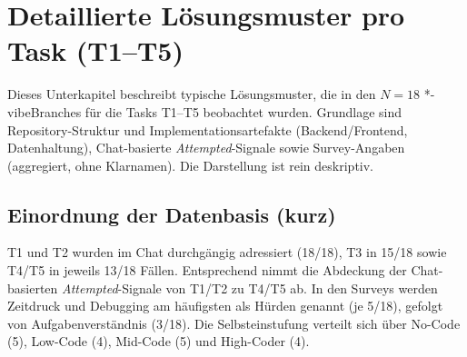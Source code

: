 \section{Detaillierte Lösungsmuster pro Task (T1--T5)}
\label{sec:results_strategies}

Dieses Unterkapitel beschreibt typische Lösungsmuster, die in den $N = 18$ *-vibeBranches für die Tasks T1--T5 beobachtet wurden. Grundlage sind Repository-Struktur und Implementationsartefakte (Backend/Frontend, Datenhaltung), Chat-basierte  \textit{Attempted}-Signale sowie Survey-Angaben (aggregiert, ohne Klarnamen). Die Darstellung ist rein deskriptiv.
\EndAccSupp{}

\subsection*{Einordnung der Datenbasis (kurz)}
T1 und T2 wurden im Chat durchgängig adressiert (18/18), T3 in 15/18 sowie T4/T5 in jeweils 13/18 Fällen. Entsprechend nimmt die Abdeckung der Chat-basierten  \textit{Attempted}-Signale von T1/T2 zu T4/T5 ab. In den Surveys werden Zeitdruck und Debugging am häufigsten als Hürden genannt (je 5/18), gefolgt von Aufgabenverständnis (3/18). Die Selbsteinstufung verteilt sich über No-Code (5), Low-Code (4), Mid-Code (5) und High-Coder (4).

